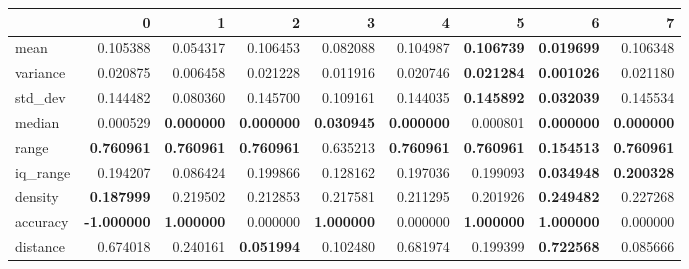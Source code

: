 \begin{tabular}{lrrrrrrrr}
\toprule
 & 0 & 1 & 2 & 3 & 4 & 5 & 6 & 7 \\
\midrule
mean & 0.105388 & 0.054317 & 0.106453 & 0.082088 & 0.104987 & \color{f_green} \bfseries 0.106739 & \color{f_darkred} \bfseries 0.019699 & 0.106348 \\
variance & 0.020875 & 0.006458 & 0.021228 & 0.011916 & 0.020746 & \color{f_green} \bfseries 0.021284 & \color{f_darkred} \bfseries 0.001026 & 0.021180 \\
std\_dev & 0.144482 & 0.080360 & 0.145700 & 0.109161 & 0.144035 & \color{f_green} \bfseries 0.145892 & \color{f_darkred} \bfseries 0.032039 & 0.145534 \\
median & 0.000529 & \color{f_darkred} \bfseries 0.000000 & \color{f_darkred} \bfseries 0.000000 & \color{f_green} \bfseries 0.030945 & \color{f_darkred} \bfseries 0.000000 & 0.000801 & \color{f_darkred} \bfseries 0.000000 & \color{f_darkred} \bfseries 0.000000 \\
range & \color{f_green} \bfseries 0.760961 & \color{f_green} \bfseries 0.760961 & \color{f_green} \bfseries 0.760961 & 0.635213 & \color{f_green} \bfseries 0.760961 & \color{f_green} \bfseries 0.760961 & \color{f_darkred} \bfseries 0.154513 & \color{f_green} \bfseries 0.760961 \\
iq\_range & 0.194207 & 0.086424 & 0.199866 & 0.128162 & 0.197036 & 0.199093 & \color{f_darkred} \bfseries 0.034948 & \color{f_green} \bfseries 0.200328 \\
density & \color{f_darkred} \bfseries 0.187999 & 0.219502 & 0.212853 & 0.217581 & 0.211295 & 0.201926 & \color{f_green} \bfseries 0.249482 & 0.227268 \\
accuracy & \color{f_darkred} \bfseries -1.000000 & \color{f_green} \bfseries 1.000000 & 0.000000 & \color{f_green} \bfseries 1.000000 & 0.000000 & \color{f_green} \bfseries 1.000000 & \color{f_green} \bfseries 1.000000 & 0.000000 \\
distance & 0.674018 & 0.240161 & \color{f_darkred} \bfseries 0.051994 & 0.102480 & 0.681974 & 0.199399 & \color{f_green} \bfseries 0.722568 & 0.085666 \\
\bottomrule
\end{tabular}
